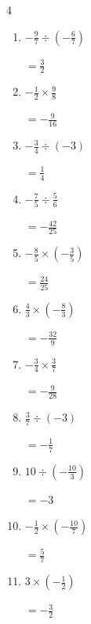 \begin{multicols}{4}
\begin{enumerate}
        $\displaystyle =-\frac{35}{8}$

  \item $\displaystyle -\frac{9}{7}\div{}\left(-\frac{6}{7}\right)$

        $\displaystyle =\frac{3}{2}$

\columnbreak %

  \item $\displaystyle -\frac{1}{2}\times{}\frac{9}{8}$

        $\displaystyle =-\frac{9}{16}$

  \item $\displaystyle -\frac{3}{4}\div{}\left(-3\right)$

        $\displaystyle =\frac{1}{4}$

  \item $\displaystyle -\frac{7}{5}\div{}\frac{5}{6}$

        $\displaystyle =-\frac{42}{25}$

  \item $\displaystyle -\frac{8}{5}\times{}\left(-\frac{3}{5}\right)$

        $\displaystyle =\frac{24}{25}$

  \item $\displaystyle \frac{4}{3}\times{}\left(-\frac{8}{3}\right)$

        $\displaystyle =-\frac{32}{9}$

  \item $\displaystyle -\frac{3}{4}\times{}\frac{3}{7}$

        $\displaystyle =-\frac{9}{28}$

  \item $\displaystyle \frac{3}{7}\div{}\left(-3\right)$

        $\displaystyle =-\frac{1}{7}$

  \item $\displaystyle 10\div{}\left(-\frac{10}{3}\right)$

        $\displaystyle =-3$

  \item $\displaystyle -\frac{1}{2}\times{}\left(-\frac{10}{7}\right)$

        $\displaystyle =\frac{5}{7}$

  \item $\displaystyle 3\times{}\left(-\frac{1}{2}\right)$

        $\displaystyle =-\frac{3}{2}$

\columnbreak %


\end{enumerate}
\end{multicols}
